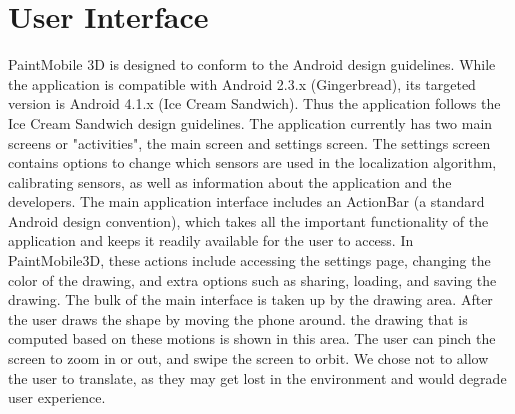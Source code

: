 \documentclass{chi-ext}
\begin{document}

\section{User Interface}

PaintMobile 3D is designed to conform to the Android design guidelines. While the application is compatible with Android 2.3.x (Gingerbread), its targeted version is Android 4.1.x (Ice Cream Sandwich). Thus the application follows the Ice Cream Sandwich design guidelines. The application currently has two main screens or "activities", the main screen and settings screen. The settings screen contains options to change which sensors are used in the localization algorithm, calibrating sensors, as well as information about the application and the developers. The main application interface includes an ActionBar (a standard Android design convention), which takes all the important functionality of the application and keeps it readily available for the user to access. In PaintMobile3D, these actions include accessing the settings page, changing the color of the drawing, and extra options such as sharing, loading, and saving the drawing. The bulk of the main interface is taken up by the drawing area. After the user draws the shape by moving the phone around. the drawing that is computed based on these motions is shown in this area. The user can pinch the screen to zoom in or out, and swipe the screen to orbit. We chose not to allow the user to translate, as they may get lost in the environment and would degrade user experience. 
\end{document}
